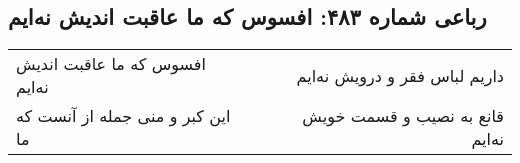 \begin{center}
\section*{رباعی شماره ۴۸۳: افسوس که ما عاقبت اندیش نه‌ایم}
\label{sec:sh483}
\begin{longtable}{l p{0.5cm} r}
افسوس که ما عاقبت اندیش نه‌ایم
&&
داریم لباس فقر و درویش نه‌ایم
\\
این کبر و منی جمله از آنست که ما
&&
قانع به نصیب و قسمت خویش نه‌ایم
\\
\end{longtable}
\end{center}
